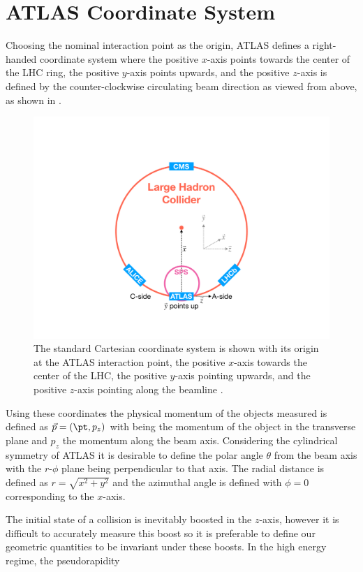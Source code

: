 \section{ATLAS Coordinate System} \label{sec:atlas:coordinates}

Choosing the nominal interaction point as the origin, ATLAS defines a right-handed
coordinate system where the positive $x$-axis points towards the center of the
LHC ring, the positive $y$-axis points upwards, and the positive $z$-axis is
defined by the counter-clockwise circulating beam direction as viewed from
above, as shown in  \cite{PERF-2007-01}.  
 
\begin{figure}[!htbp]
  \begin{center}
    \includegraphics[width=0.7\linewidth]{figures/atlas/atlas_geometry}
    \caption{ The standard Cartesian coordinate system is shown with its origin at
the ATLAS interaction point, the positive $x$-axis towards the center of the
LHC, the positive $y$-axis pointing upwards, and the positive $z$-axis pointing
along the beamline \cite{Feickert:2690521}.}
    \label{fig:atlas_geometry}
  \end{center}
\end{figure}

Using these coordinates the physical momentum of the objects measured is
defined as $\vec{p} = (\pt,p_z)$ with \pt being the momentum of the object in
the transverse plane and $p_z$ the momentum along the beam axis. Considering
the cylindrical symmetry of ATLAS it is desirable to define the polar angle
$\theta$ from the beam axis with the $r$-$\phi$ plane being perpendicular to
that axis.  The radial distance is defined as $r = \sqrt{x^2+y^2}$ and the
azimuthal angle is defined with $\phi = 0$ corresponding to the $x$-axis.

The initial state of a collision is inevitably boosted in the $z$-axis, however
it is difficult to accurately measure this boost so it is preferable to define our
geometric quantities to be invariant under these boosts. In the high energy
regime, the pseudorapidity 

